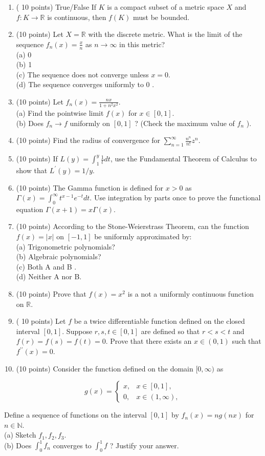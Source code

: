 \documentclass[10pt]{article}
\begin{document}
\begin{enumerate}
  \item ( 10 points) True/False If $K$ is a compact subset of a metric space $X$ and $f: K \rightarrow \mathbb{R}$ is continuous, then $f(K)$ must be bounded.
  \item (10 points) Let $X=\mathbb{R}$ with the discrete metric. What is the limit of the sequence $f_{n}(x)=\frac{x}{n}$ as $n \rightarrow \infty$ in this metric?\\
(a) 0\\
(b) 1\\
(c) The sequence does not converge unless $x=0$.\\
(d) The sequence converges uniformly to 0 .
  \item (10 points) Let $f_{n}(x)=\frac{n x}{1+n^{2} x^{2}}$.\\
(a) Find the pointwise limit $f(x)$ for $x \in[0,1]$.\\
(b) Does $f_{n} \rightarrow f$ uniformly on $[0,1]$ ? (Check the maximum value of $f_{n}$ ).
  \item (10 points) Find the radius of convergence for $\sum_{n=1}^{\infty} \frac{n^{n}}{n!} z^{n}$.
  \item (10 points) If $L(y)=\int_{1}^{y} \frac{1}{t} d t$, use the Fundamental Theorem of Calculus to show that $L^{\prime}(y)=1 / y$.
  \item (10 points) The Gamma function is defined for $x>0$ as $\Gamma(x)=\int_{0}^{\infty} t^{x-1} e^{-t} d t$. Use integration by parts once to prove the functional equation $\Gamma(x+1)=x \Gamma(x)$.
  \item (10 points) According to the Stone-Weierstrass Theorem, can the function $f(x)=|x|$ on $[-1,1]$ be uniformly approximated by:\\
(a) Trigonometric polynomials?\\
(b) Algebraic polynomials?\\
(c) Both A and B .\\
(d) Neither A nor B.
  \item (10 points) Prove that $f(x)=x^{2}$ is a not a uniformly continuous function on $\mathbb{R}$.
  \item ( 10 points) Let $f$ be a twice differentiable function defined on the closed interval $[0,1]$. Suppose $r, s, t \in[0,1]$ are defined so that $r<s<t$ and $f(r)=f(s)=f(t)=0$. Prove that there exists an $x \in(0,1)$ such that $f^{\prime \prime}(x)=0$.
  \item (10 points) Consider the function defined on the domain $[0, \infty)$ as
\end{enumerate}

$$
g(x)=\left\{\begin{array}{lr}
x, & x \in[0,1], \\
0, & x \in(1, \infty),
\end{array}\right.
$$

Define a sequence of functions on the interval $[0,1]$ by $f_{n}(x)=n g(n x)$ for $n \in \mathbb{N}$.\\
(a) Sketch $f_{1}, f_{2}, f_{3}$.\\
(b) Does $\int_{0}^{1} f_{n}$ converges to $\int_{0}^{1} f$ ? Justify your answer.
\end{document}
